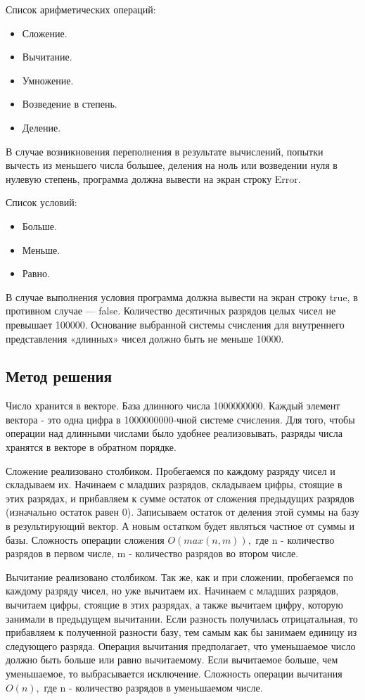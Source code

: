 \documentclass[12pt]{article}
\begin{document}
Список арифметических операций:
\begin{itemize}
    \item Сложение.
    \item Вычитание.
    \item Умножение.
    \item Возведение в степень.
    \item Деление.
\end{itemize}
В случае возникновения переполнения в результате вычислений, попытки вычесть из меньшего числа большее, деления на ноль или возведении нуля в нулевую степень, программа должна вывести на экран строку Error.

Список условий:
\begin{itemize}
    \item Больше.
    \item Меньше.
    \item Равно.
\end{itemize}

В случае выполнения условия программа должна вывести на экран строку true, в противном случае — false.
Количество десятичных разрядов целых чисел не превышает 100000. Основание выбранной системы счисления для внутреннего представления «длинных» чисел должно быть не меньше 10000.

\subsection*{Метод решения}

Число хранится в векторе. База длинного числа 1000000000. Каждый элемент вектора - это одна цифра в 1000000000-чной системе счисления. Для того, чтобы операции над длинными числами было удобнее реализовывать, разряды числа хранятся в векторе в обратном порядке.

Сложение реализовано столбиком. Пробегаемся по каждому разряду чисел и складываем их. Начинаем с младших разрядов, складываем цифры, стоящие в этих разрядах, и прибавляем к сумме остаток от сложения предыдущих разрядов (изначально остаток равен 0). Записываем остаток от деления этой суммы на базу в результирующий вектор. А новым остатком будет являться частное от суммы и базы. Сложность операции сложения $O(max(n, m)), $ где n - количество разрядов в первом числе, m - количество разрядов во втором числе.

Вычитание реализовано столбиком. Так же, как и при сложении, пробегаемся по каждому разряду чисел, но уже вычитаем их. Начинаем с младших разрядов, вычитаем цифры, стоящие в этих разрядах, а также вычитаем цифру, которую занимали в предыдущем вычитании. Если разность получилась отрицатальная, то прибавляем к полученной разности базу, тем самым как бы занимаем единицу из следующего разряда. Операция вычитания предполагает, что уменьшаемое число должно быть больше или равно вычитаемому. Если вычитаемое больше, чем уменьшаемое, то выбрасывается исключение.
Сложность операции вычитания $O(n), $ где n - количество разрядов в уменьшаемом числе.
\end{document}
